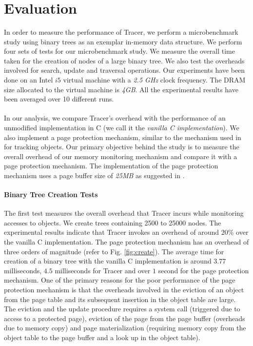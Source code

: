 \section{Evaluation}
\label{sec:eval}
\paragraph{}
In order to measure the performance of Tracer, we perform a microbenchmark study using binary trees as an exemplar in-memory data structure. We perform four sets of tests for our microbenchmark study. We measure the overall time taken for the creation of nodes of a large binary tree. We also test the overheads involved for search, update and traversal operations. Our experiments have been done on an Intel $i5$ virtual machine with a {\emph{2.5 GHz}} clock frequency. The DRAM size allocated to the virtual machine is {\emph{4GB}}. All the experimental results have been averaged over 10 different runs. 

\paragraph{}
In our analysis, we compare Tracer's overhead with the performance of an unmodified implementation in C (we call it the {\emph{vanilla C implementation}}). We also implement a page protection mechanism, similar to the mechanism used in \cite{SSDAlloc} for tracking objects. Our primary objective behind the study is to measure the overall overhead of our memory monitoring mechanism and compare it with a page protection mechanism. The implementation of the page protection mechanism uses a page buffer size of {\emph{25MB}} as suggested in \cite{SSDAlloc}.

\paragraph{Binary Tree Creation Tests}
The first test measures the overall overhead that Tracer incurs while monitoring accesses to objects. We create trees containing 2500 to 25000 nodes. The experimental results indicate that Tracer invokes an overhead of around $20\%$ over the vanilla C implementation. The page protection mechanism has an overhead of three orders of magnitude (refer to Fig. \ref{fig:create}). The average time for creation of a binary tree with the vanilla C implementation is around $3.77$ milliseconds, $4.5$ milliseconds for Tracer and over $1$ second for the page protection mechanism. One of the primary reasons for the poor performance of the page protection mechanism is that the overheads involved in the eviction of an object from the page table and its subsequent insertion in the object table are large. The eviction and the update procedure requires a system call (triggered due to access to a protected page), eviction of the page from the page buffer (overheads due to memory copy) and page materialization (requiring memory copy from the object table to the page buffer and a look up in the object table). 

